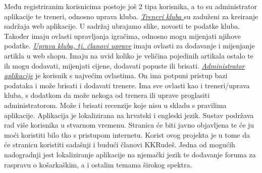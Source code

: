 \bigbreak
\textnormal {Među registriranim korisnicima postoje još 2 tipa korisnika, a to su administrator aplikacije te treneri, odnosno uprava kluba.}
\bigbreak
\underline{\textit{Treneri kluba} }\textnormal {su zaduženi za kreiranje sadržaja web aplikacije. U sadržaj ubrajamo slike, novosti te podatke kluba.  Također imaju ovlasti upravljanja igračima, odnosno mogu mijenjati njihove podatke.}
\bigbreak
\underline{\textit{Uprava kluba, tj. članovi uprave}} \textnormal {imaju ovlasti za dodavanje i mijenjanje artikla u web shopu. Imaju na uvid koliko je veličina pojedinih artikala ostalo te ih mogu dodavati, mijenjati cijene, dodavati popuste ili brisati.}
\bigbreak
\textit{\underline{Administrator  aplikacije} }\textnormal {je korisnik s najvećim ovlastima. On ima potpuni pristup bazi podataka i može brisati i dodavati trenere. Ima sve ovlasti kao i treneri/uprava kluba, s dodatkom da može nekoga od trenera ili uprave proglasiti administratorom. Može i brisati recenzije koje nisu u skladu s pravilima aplikacije.}
\bigbreak
\textnormal{Aplikacija je lokalizirana na hrvatski i engleski jezik. Sustav podržava rad više korisnika u stvarnom vremenu.}
\textnormal{Stranica će biti javno objavljena te će ju moći koristiti bilo tko s pristupom internetu. Korist ovog projekta je u tome da će stranicu koristiti sadašnji i budući članovi KKRudeš. Jedna od mogućih nadogradnji jest lokaliziranje aplikacije na njemački jezik te dodavanje foruma za raspravu o košarkaškim, a i ostalim temama širokog spektra.}
		
		


		
		

		
